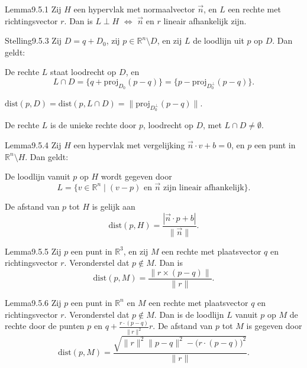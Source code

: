 \begin{res}{Lemma}{9.5.1}
Zij $H$ een hypervlak met normaalvector $\vec n$, en $L$ een rechte met richtingsvector $r$. Dan is $L\perp H$ \(\iff\) $\vec n$ en $r$ lineair afhankelijk zijn.
\end{res}

\begin{res}{Stelling}{9.5.3}
Zij $D=q+D_0$, zij $p\in\mathbb R^n\setminus D$, en zij $L$ de loodlijn uit $p$ op $D$. Dan geldt:
\begin{myenum}
\item De rechte $L$ staat loodrecht op $D$, en
\[
L\cap D=\{q+\mathrm{proj}_{D_0}(p-q)\}=\{p-\mathrm{proj}_{D_0^\perp}(p-q)\}.
\]
\item $\mathrm{dist}(p,D)=\mathrm{dist}(p,L\cap D)=\|\mathrm{proj}_{D_0^\perp}(p-q)\|$.
\item De rechte $L$ is de unieke rechte door $p$, loodrecht op $D$, met $L\cap D\ne\emptyset$.
\end{myenum}
\end{res}

\begin{res}{Lemma}{9.5.4}
Zij $H$ een hypervlak met vergelijking $\vec n\cdot v+b=0$, en $p$ een punt in $\mathbb R^n\setminus H$. Dan geldt:
\begin{myenum}
\item De loodlijn vanuit $p$ op $H$ wordt gegeven door
\[
L=\{v\in\mathbb R^n \mid (v-p) \text{ en } \vec n \text{ zijn lineair afhankelijk}\}.
\]
\item De afstand van $p$ tot $H$ is gelijk aan
\[
\mathrm{dist}(p,H)=\frac{|\vec n\cdot p+b|}{\|\vec n\|}.
\]
\end{myenum}
\end{res}

\begin{res}{Lemma}{9.5.5}
Zij $p$ een punt in $\mathbb R^3$, en zij $M$ een rechte met plaatsvector $q$ en richtingsvector $r$. Veronderstel dat $p\notin M$. Dan is
\[
\mathrm{dist}(p,M)=\frac{\|r\times(p-q)\|}{\|r\|}.
\]
\end{res}

\begin{res}{Lemma}{9.5.6}
Zij $p$ een punt in $\mathbb R^n$ en $M$ een rechte met plaatsvector $q$ en richtingsvector $r$. Veronderstel dat $p\notin M$. Dan is de loodlijn $L$ vanuit $p$ op $M$ de rechte door de punten $p$ en $q+\frac{r\cdot(p-q)}{\|r\|^2}r$. De afstand van $p$ tot $M$ is gegeven door
\[
\mathrm{dist}(p,M)=\frac{\sqrt{\|r\|^2\|p-q\|^2-\big(r\cdot(p-q)\big)^2}}{\|r\|}.
\]
\end{res}

